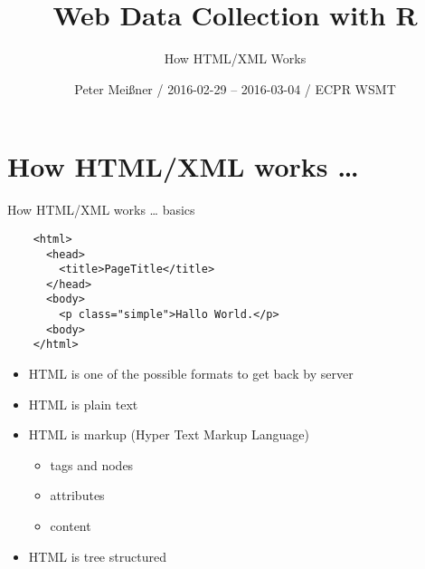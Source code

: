 \documentclass[ignorenonframetext,]{beamer}
\title{Web Data Collection with R}
\subtitle{How HTML/XML Works}
\author{Peter Meißner / 2016-02-29 -- 2016-03-04 / ECPR WSMT}
\date{}
\providecommand{\tightlist}{%
  \setlength{\itemsep}{0pt}\setlength{\parskip}{0pt}}
\begin{document}
\frame{\titlepage}

\begin{frame}
\tableofcontents[hideallsubsections]
\end{frame}

\section{How HTML/XML works \ldots{}}\label{how-htmlxml-works}

\begin{frame}[fragile]{How HTML/XML works \ldots{} basics}

\begin{verbatim}
    <html>
      <head>
        <title>PageTitle</title>
      </head>
      <body>
        <p class="simple">Hallo World.</p>
      <body>
    </html>
\end{verbatim}

\begin{itemize}
\tightlist
\item
  HTML is one of the possible formats to get back by server
\item
  HTML is plain text
\item
  HTML is markup (Hyper Text Markup Language)

  \begin{itemize}
  \tightlist
  \item
    tags and nodes
  \item
    attributes
  \item
    content
  \end{itemize}
\item
  HTML is tree structured
\end{itemize}

\end{frame}
\end{document}
